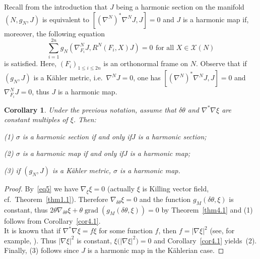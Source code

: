 \documentclass[a4paper,reqno]{amsart}
\newtheorem{cor}[thm]{Corollary}
\theoremstyle{definition}
\theoremstyle{remark}
\theoremstyle{plain}
\numberwithin{equation}{section}
\newcommand{\calX}{{\mathcal{X}}}
\def\grad{\operatorname {grad}}
\newcommand{\kahler}{K\"ahler\xspace}
\newcommand{\sissi}{if and only if\xspace}
\begin{document}




 Recall from the introduction 
 that $J$ being a harmonic section on the manifold
 $(N,g_N,J)$ is equivalent to $[(\nabla^N)^*\nabla^N J,J]= 0$ and
 $J$ is a harmonic map if, moreover, the following equation
\[
\sum_{i=1}^{2n} g_N(\nabla^N_{F_i} J, R^N(F_i,X)J) = 0 \ \,
\text{for all $X \in \calX(N)$}
\]
is satisfied. Here, %
$(F_i)_{1 \le i \le 2n}$ is an orthonormal frame
on $N$.
 Observe that if $(g_N,J)$ is a \kahler metric, i.e.~$\nabla^N
 J=0$, one has  $[(\nabla^N)^*\nabla^N J,J]= 0$ and $\nabla^N_{F_i}
 J=0$, thus $J$ is a harmonic map. 


 \begin{cor}
   \label{cor3.9}
   Under the previous notation, assume that $\delta \theta$  and
   $\nabla^*\nabla \xi$  are
   constant multiples of $\xi$. Then: 

   {\rm (1)}  $\sigma$ is a harmonic section \sissi $J$ is a
   harmonic section;

   {\rm (2)}  $\sigma$ is a harmonic map \sissi $J$ is a
   harmonic map;
   
   {\rm (3)} if $(g_N,J)$ is a \kahler metric, $\sigma$ is a
   harmonic map.
 \end{cor}


 \begin{proof}
   By~\eqref{eq5} we have $\nabla_\xi \xi = 0$ (actually $\xi$
   is Killing vector field, cf.~Theorem~\ref{thm1.1}). Therefore
   $\nabla_{\delta \theta} \xi = 0$ and the function
   $g_M(\delta \theta,\xi)$ is constant, thus $ 2 \theta \nabla_{\delta \theta} \xi  + \theta
 \grad(g_M(\delta\theta,\xi)) =0$
   by Theorem~\ref{thm4.1} and (1) follows from
 Corollary~\ref{cor4.1}.%
   \\
   It is known that if $\nabla^* \nabla \xi = f \xi$ for some
   function $f$, then $f= |\nabla{\xi}|^2$ (see, for example,
   \cite[Lemma~7.1, \& Proposition~8.1]{Str}). Thus
   $|\nabla{\xi}|^2$ is constant,
   $\xi\bigl(|\nabla{\xi}|^2\bigr) =0$ and
 Corollary~\ref{cor4.1}  yields~(2). Finally, (3) follows
   since $J$ is a harmonic map in the K\"ahlerian case.
    \end{proof}
\end{document}
